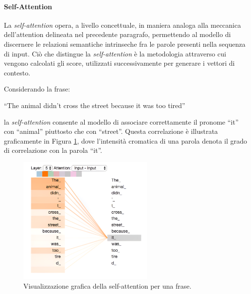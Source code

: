 \documentclass[12pt,a4paper,twoside,openright]{book}
\begin{document}
\paragraph{Self-Attention}

La \emph{self-attention} opera, a livello concettuale, in maniera analoga alla meccanica dell'attention delineata nel precedente paragrafo, permettendo al modello di discernere le relazioni semantiche intrinseche fra le parole presenti nella sequenza di input. Ciò che distingue la \emph{self-attention} è la metodologia attraverso cui vengono calcolati gli score, utilizzati successivamente per generare i vettori di contesto.

Considerando la frase:
\begin{center}
    ``The animal didn't cross the street because it was too tired''
\end{center}
la \emph{self-attention} consente al modello di associare correttamente il pronome ``it'' con ``animal'' piuttosto che con ``street''. Questa correlazione è illustrata graficamente in Figura \ref{fig:attention-rel}, dove l'intensità cromatica di una parola denota il grado di correlazione con la parola ``it''.

\begin{figure}
    \centering
    \includegraphics[width=0.6\textwidth]{images/transformer_self-attention_visualization.png}
    \caption{Visualizzazione grafica della self-attention per una frase.}
    \label{fig:attention-rel}
\end{figure}
\end{document}
